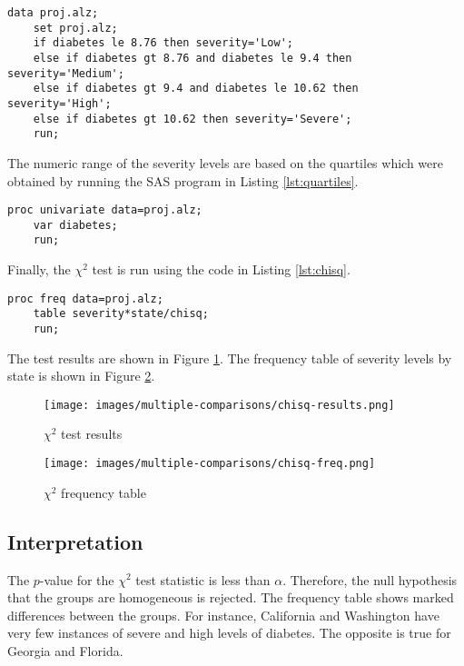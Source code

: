 \documentclass{article}
\begin{document}
\begin{lstlisting}[language=SAS,caption=Adding the severity column to the dataset,captionpos=b,label=lst:severity]
    data proj.alz; 
    set proj.alz; 
    if diabetes le 8.76 then severity='Low'; 
    else if diabetes gt 8.76 and diabetes le 9.4 then severity='Medium'; 
    else if diabetes gt 9.4 and diabetes le 10.62 then severity='High'; 
    else if diabetes gt 10.62 then severity='Severe'; 
    run;
\end{lstlisting}

The numeric range of the severity levels are based on the quartiles which were obtained by running the SAS program in Listing \ref{lst:quartiles}.

\begin{lstlisting}[language=SAS,caption=Obtaining quartiles for the diabetes variable,captionpos=b,label=lst:quartiles]
    proc univariate data=proj.alz;
    var diabetes;
    run;
\end{lstlisting}

Finally, the $\chi^2$ test is run using the code in Listing \ref{lst:chisq}.

\begin{lstlisting}[language=SAS,caption=$\chi^2$ test for homogeneity variable,captionpos=b,label=lst:chisq]
    proc freq data=proj.alz;
    table severity*state/chisq;
    run;
\end{lstlisting}

The test results are shown in Figure \ref{fig:chisq-results}. The frequency table of severity levels by state is shown in Figure \ref{fig:chisq-freq}.

\begin{figure}[ht]
    \centering
    \texttt{[image: images/multiple-comparisons/chisq-results.png]}
    \caption{$\chi^2$ test results}
    \label{fig:chisq-results}
\end{figure}

\begin{figure}[ht]
    \centering
    \texttt{[image: images/multiple-comparisons/chisq-freq.png]}
    \caption{$\chi^2$ frequency table}
    \label{fig:chisq-freq}
\end{figure}

\clearpage

\subsection{Interpretation}
The $p$-value for the $\chi^2$ test statistic is less than $\alpha$. Therefore, the null hypothesis that the groups are homogeneous is rejected. The frequency table shows marked differences between the groups. For instance, California and Washington have very few instances of severe and high levels of diabetes. The opposite is true for Georgia and Florida.
\end{document}
